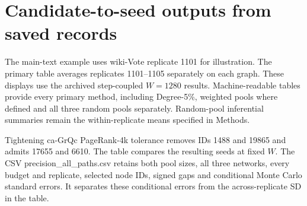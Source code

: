 \section{Candidate-to-seed outputs from saved records}
The main-text example uses wiki-Vote replicate 1101 for illustration. The primary table averages replicates 1101--1105 separately on each graph. These displays use the archived step-coupled $W=1280$ results. Machine-readable tables provide every primary method, including Degree-5\%, weighted pools where defined and all three random pools separately. Random-pool inferential summaries remain the within-replicate means specified in Methods.

Tightening ca-GrQc PageRank-4k tolerance removes IDs 1488 and 19865 and admits 17655 and 6610. The table compares the resulting seeds at fixed $W$. The CSV precision\_all\_paths.csv retains both pool sizes, all three networks, every budget and replicate, selected node IDs, signed gaps and conditional Monte Carlo standard errors. It separates these conditional errors from the across-replicate SD in the table.
